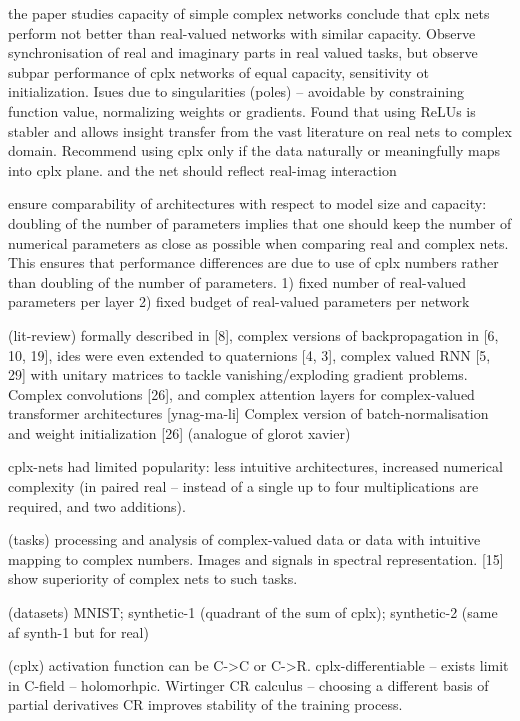 the paper studies capacity of simple complex networks
conclude that cplx nets perform not better than real-valued networks with similar capacity.
Observe synchronisation of real and imaginary parts in real valued tasks, but observe subpar
performance of cplx networks of equal capacity, sensitivity ot initialization. Isues due to 
singularities (poles) -- avoidable by constraining function value, normalizing weights or
gradients. Found that using ReLUs is stabler and allows insight transfer from the vast literature
on real nets to complex domain. Recommend using cplx only if the data naturally or meaningfully
maps into cplx plane. and the net should reflect real-imag interaction


ensure comparability of architectures with respect to model size and capacity: doubling of
the number of parameters implies that one should keep the number of numerical parameters as
close as possible when comparing real and complex nets. This ensures that performance differences
are due to use of cplx numbers rather than doubling of the number of parameters.
1) fixed number of real-valued parameters per layer
2) fixed budget of real-valued parameters per network


(lit-review) formally described in [8], complex versions of backpropagation in [6, 10, 19],
ides were even extended to quaternions [4, 3], complex valued RNN [5, 29] with unitary matrices
to tackle vanishing/exploding gradient problems. Complex convolutions [26], and complex attention
layers for complex-valued transformer architectures [ynag-ma-li]
Complex version of  batch-normalisation and weight initialization [26] (analogue of glorot xavier)

cplx-nets had limited popularity: less intuitive architectures, increased numerical complexity (in
paired real -- instead of a single up to four multiplications are required, and two additions).


(tasks) processing and analysis of complex-valued data or data with intuitive mapping to
complex numbers. Images and signals in spectral representation. [15] show superiority of complex
nets to such tasks.


(datasets) MNIST; synthetic-1 (quadrant of the sum of cplx); synthetic-2 (same af synth-1 but for real)


(cplx) activation function can be C->C or C->R. cplx-differentiable -- exists limit in
C-field -- holomorhpic. Wirtinger CR calculus -- choosing a different basis of partial derivatives
CR improves stability of the training process.


